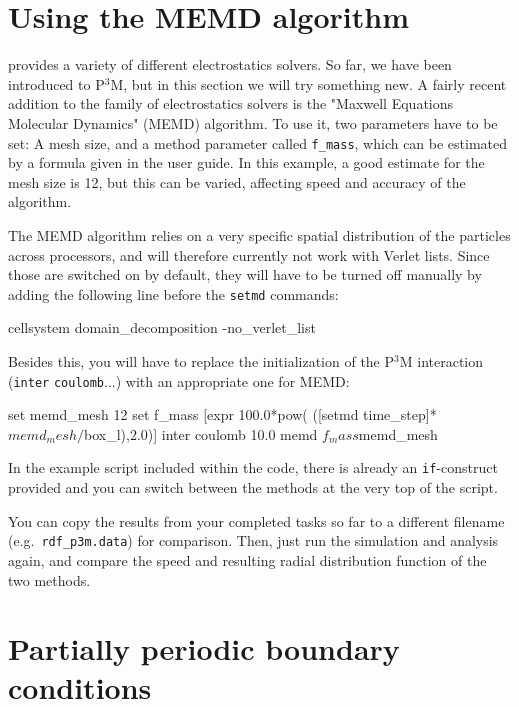 \documentclass[
a4paper,                        %
11pt,                           %
twoside,                        %
footsepline,                    %
headsepline,                    %
headexclude,                    %
footexclude,                    %
pagesize,                       %
]{scrartcl}
\begin{document}
\section{Using the MEMD algorithm}

\es{} provides a variety of different electrostatics solvers. So far,
we have been introduced to P$^3$M, but in this section we will try
something new. A fairly recent addition to the family of electrostatics
solvers is the "Maxwell Equations Molecular Dynamics" (MEMD) algorithm.
To use it, two parameters have to be set: A mesh size, and a method
parameter called \verb|f_mass|, which can be estimated by a formula
given in the \es{} user guide. In this example, a good estimate for
the mesh size is 12, but this can be varied, affecting speed and
accuracy of the algorithm.

The MEMD algorithm relies on a very specific spatial distribution of
the particles across processors, and will therefore currently not work
with Verlet lists. Since those are switched on by default, they will
have to be turned off manually by adding the following line before the
\verb|setmd| commands:

\begin{tclcode}
  cellsystem domain_decomposition -no_verlet_list
\end{tclcode}


Besides this, you will have to replace the initialization of the
P$^3$M interaction (\verb|inter| \verb|coulomb|...) with an
appropriate one for MEMD:

\begin{tclcode}
  set memd_mesh 12
  set f_mass [expr 100.0*pow( ([setmd time_step]*$memd_mesh/$box_l),2.0)]
  inter coulomb 10.0 memd $f_mass $memd_mesh
\end{tclcode}


In the example script included
within the \es{} code, there is already an \verb|if|-construct 
provided and you can switch between the methods at the very top
of the script.

You can copy the results from your completed tasks so far to a different
filename (e.g.~\verb|rdf_p3m.data|) for comparison. Then, just
run the simulation and analysis again, and compare the speed and 
resulting radial distribution function of the two methods.

\section{Partially periodic boundary conditions}
\end{document}
